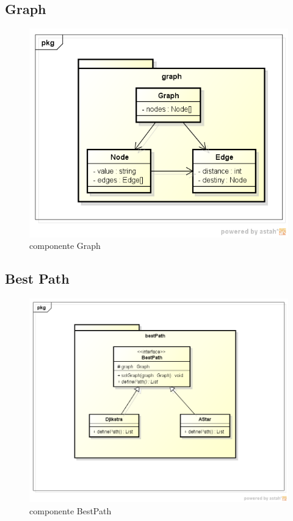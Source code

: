 \subsection{Graph}

\begin{figure}[h]
	\centering
	\label{fig24}
		\includegraphics[keepaspectratio=true,scale=0.5]{figuras/pkggraph.png}
	\caption{componente Graph}
\end{figure}

\subsection{Best Path}

\begin{figure}[h]
	\centering
	\label{fig25}
		\includegraphics[keepaspectratio=true,scale=0.5]{figuras/pkgbestPath.png}
	\caption{componente BestPath}
\end{figure}

